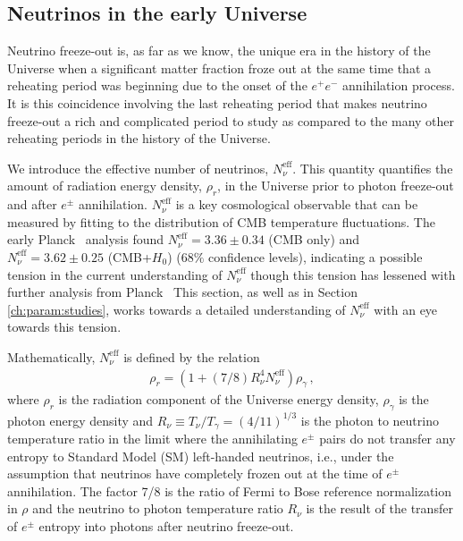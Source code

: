 \subsection{Neutrinos in the early Universe}%
\label{sec:model:ind}

Neutrino freeze-out is, as far as we know, the unique era in the history of the Universe when a significant matter fraction froze out at the same time that a reheating period was beginning due to the onset of the $e^+e^-$ annihilation process. It is this coincidence involving the last reheating period that makes neutrino freeze-out a rich and complicated period to study as compared to the many other reheating periods in the history of the Universe. 


We introduce the effective number of neutrinos, $N^{\text{eff}}_\nu$. This quantity quantifies the amount of radiation energy density, $\rho_r$, in the Universe prior to photon freeze-out and after $e^\pm$ annihilation. $N^{\text{eff}}_\nu$ is a key cosmological observable that can be measured by fitting to the distribution of CMB temperature fluctuations. The early Planck~\cite{Planck:2013pxb} analysis found $N^{\text{eff}}_{\nu}=3.36\pm 0.34$ (CMB only) and $N^{\text{eff}}_{\nu}=3.62\pm 0.25$ (CMB+$H_0$) ($68\%$ confidence levels), indicating a possible tension in the current understanding of $N^{\text{eff}}_\nu$ though this tension has lessened with further analysis from Planck~\cite{Planck:2015fie,Planck:2018vyg} This section, as well as in Section \ref{ch:param:studies}, works towards a detailed understanding of $N^{\text{eff}}_{\nu}$ with an eye towards this tension.

Mathematically, $N^{\text{eff}}_\nu$ is defined by the relation
\begin{align}\label{eq:N_eff_def}
\rho_r=\left(1+(7/8)R_\nu^{4}N^{\text{eff}}_\nu\right)\rho_\gamma\,,
\end{align}
where $\rho_r$ is the radiation component of the Universe energy density, $\rho_\gamma$ is the photon energy density and $R_\nu\equiv T_\nu/T_\gamma=({4}/{11})^{1/3}$ is the photon to neutrino temperature ratio in the limit where the annihilating $e^\pm$ pairs do not transfer any entropy to Standard Model (SM) left-handed neutrinos, i.e., under the assumption that neutrinos have completely frozen out at the time of $e^\pm$ annihilation. The factor 7/8 is the ratio of Fermi to Bose reference normalization in $\rho$ and the neutrino to photon temperature ratio $R_\nu$ is the result of the transfer of $e^\pm$ entropy into photons after neutrino freeze-out. 

